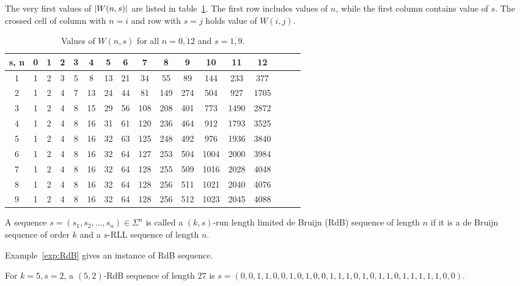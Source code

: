 The very first values of $\left \lvert W(n,s) \right \rvert$ are listed in table~\ref{tab:values_of_W}. The first row includes values of $n$, while the first column contains value of $s$. The crossed cell of column with $n=i$ and row with $s=j$ holds value of $W(i,j)$. 
\begin{table}[htbp]
    \centering
    \begin{tabular}{||c||c|c|c|c|c|c|c|c|c|c|c|c|c|c|c|c|}
    \hline\hline
        s, n & 0 & 1 & 2 & 3 & 4 & 5 & 6 & 7 & 8 & 9 & 10 & 11 & 12\\
        \hline\hline
        1 & 1 & 2 & 3 & 5 & 8 & 13 & 21 & 34 & 55 & 89 & 144 & 233 & 377\\
        2 & 1 & 2 & 4 & 7 & 13 & 24 & 44 & 81 & 149 & 274 & 504 & 927 & 1705\\ 
        3 & 1 & 2 & 4 & 8 & 15 & 29 & 56 & 108 & 208 & 401 & 773 & 1490 & 2872\\
        4 & 1 & 2 & 4 & 8 & 16 & 31 & 61 & 120 & 236 & 464 & 912 & 1793 & 3525\\
        5 & 1 & 2 & 4 & 8 & 16 & 32 & 63 & 125 & 248 & 492 & 976 & 1936 & 3840\\
        6 & 1 & 2 & 4 & 8 & 16 & 32 & 64 & 127 & 253 & 504 & 1004 & 2000 & 3984\\
        7 & 1 & 2 & 4 & 8 & 16 & 32 & 64 & 128 & 255 & 509 & 1016 & 2028 & 4048\\
        8 & 1 & 2 & 4 & 8 & 16 & 32 & 64 & 128 & 256 & 511 & 1021 & 2040 & 4076\\
        9 & 1 & 2 & 4 & 8 & 16 & 32 & 64 & 128 & 256 & 512 & 1023 & 2045 & 4088\\
        \hline
    \end{tabular}
    \caption{Values of $W(n,s)$ for all $n=\overline{0,12}$ and $s=\overline{1,9}$.}
    \label{tab:values_of_W}
\end{table}

\begin{definition}
    A sequence $s=(s_{1},s_{2},\ldots,s_{n})\in\Sigma^{n}$ is called a $(k,s)$-run length limited de Bruijn (\gls{RdB}) sequence of length $n$ if it is a de Bruijn sequence of order $k$ and a $s$-RLL sequence of length $n$.
\end{definition}
Example~\ref{exp:RdB} gives an instance of \gls{RdB} sequence.
\begin{example}\label{exp:RdB}
    For $k=5,s=2$, a $(5,2)$-RdB sequence of length $27$ is $s=(0, 0, 1, 1, 0, 0, 1, 0, 1, 0, 0, 1, 1, 1, 0, 1, 0, 1, 1, 0, 1, 1, 1, 1, 1, 0, 0)$. 
\end{example}

